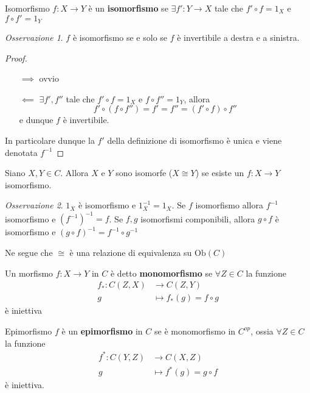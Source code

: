 \documentclass[notitlepage]{report}
\newcounter{theo}[section]\setcounter{theo}{0}
\numberwithin{equation}{section}
\theoremstyle{plain}
\theoremstyle{definition}
\theoremstyle{remark}
\newtheorem*{remark}{Osservazione}
\begin{document}
\begin{definition}{Isomorfismo}
    \(f : X \to Y\) è un \textbf{isomorfismo} se \(\exists f' : Y \to X\) tale che \(f'
    \circ f = 1_X\) e \(f \circ f' = 1_Y\) 
\end{definition}
\begin{remark}{}
    \(f\) è isomorfismo se e solo se \(f\) è invertibile a destra e a sinistra. 
\end{remark}
\begin{proof}\( \)
\begin{itemize}
    \item[\(\implies \)] ovvio
    \item[\(\impliedby \)] \(\exists f', f''\) tale che \(f' \circ f = 1_X\)  e
        \(f \circ f'' = 1_Y\), allora
        \[
          f' \circ {( f \circ f'')} = f' = f'' = {(f' \circ f)} \circ f''
        \]
        e dunque \(f\) è invertibile.
\end{itemize}
    In particolare dunque la \(f'\) della definizione di isomorfismo è unica e
    viene denotata \(f^{-1}\) 
\end{proof}

\begin{definition}{}
    Siano \(X, Y \in C\). Allora \(X\) e \(Y\) sono isomorfe (\(X \cong Y\)) se
    esiste un \(f: X \to Y\) isomorfismo.
\end{definition}

\begin{remark}{}
    \(1_X\) è isomorfismo e \(1_X^{-1} = 1_X\). Se \(f\) isomorfismo
    allora \(f^{-1}\) isomorfismo e \({(f^{-1})}^{-1} = f\). Se \(f, g\)
    isomorfismi componibili, allora \(g \circ f\) è isomorfismo e \({(g \circ f)}^{-1} = f^{-1} \circ g^{-1}\) 

    Ne segue che \(\cong\) è una relazione di equivalenza su \(\mathrm{Ob}{(C)}\) 
\end{remark}

\begin{definition}{}
    Un morfismo \(f : X \to Y\) in \(C\) è detto \textbf{monomorfismo} se \(\forall Z \in C\) la funzione 
    \begin{align*}
        f_*: C{(Z, X)} &\longrightarrow C{(Z, Y)} \\
        g &\longmapsto f_*(g) = f \circ g
    \end{align*}
    è iniettiva
\end{definition}
\begin{definition}{Epimorfismo}
    \(f\) è un \textbf{epimorfismo} in \(C\) se è monomorfismo in \(C^{op}\),
    ossia \(\forall Z \in C\) la funzione
    \begin{align*}
        f^*: C{(Y, Z)} &\longrightarrow C{(X, Z)} \\
        g &\longmapsto f^*(g) = g \circ f
    \end{align*}
    è iniettiva.
\end{definition}
\end{document}
